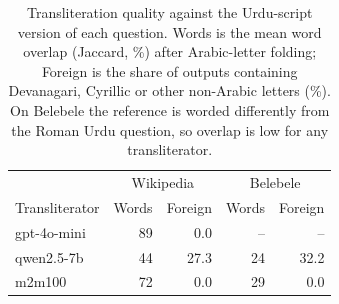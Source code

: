 \begin{table}[t]\centering\small\setlength{\tabcolsep}{4pt}
\begin{tabular}{lrrrr}\toprule
& \multicolumn{2}{c}{Wikipedia} & \multicolumn{2}{c}{Belebele} \\
Transliterator & Words & Foreign & Words & Foreign \\
\midrule
gpt-4o-mini & 89 & 0.0 & -- & -- \\
qwen2.5-7b & 44 & 27.3 & 24 & 32.2 \\
m2m100 & 72 & 0.0 & 29 & 0.0 \\
\bottomrule\end{tabular}
\caption{Transliteration quality against the Urdu-script version of each question. Words is the mean word overlap (Jaccard, \%) after Arabic-letter folding; Foreign is the share of outputs containing Devanagari, Cyrillic or other non-Arabic letters (\%). On Belebele the reference is worded differently from the Roman Urdu question, so overlap is low for any transliterator.}\label{tab:translit}
\end{table}
